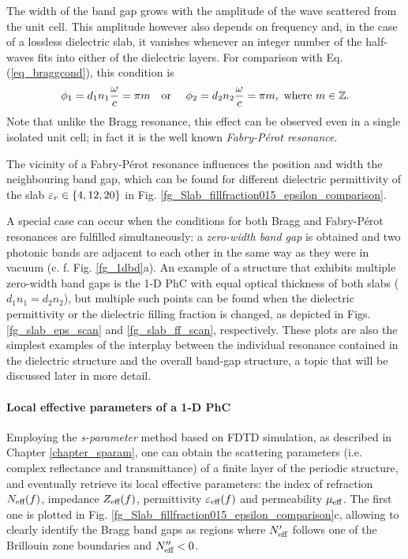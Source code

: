 The width of the band gap grows with the amplitude of the wave scattered from the unit cell. This amplitude however also depends on frequency and, in the case of a lossless dielectric slab, it vanishes whenever an integer number of the half-waves fits into either of the dielectric layers. For comparison with Eq. (\ref{eq_braggcond}), this condition is
\begin{equation} \phi_{1} = d_1 n_1 \frac{\omega}{c} = \pi m \text{\quad or \quad} \phi_{2} = d_2 n_2 \frac{\omega}{c} = \pi m, \text{ where } m\in \mathbb{Z}. \label{eq_fpcond}\end{equation}
Note that unlike the Bragg resonance, this effect can be observed even in a single isolated unit cell; in fact it is the well known \textit{Fabry-Pérot resonance}. 

The vicinity of a Fabry-Pérot resonance influences the position and width the neighbouring band gap, which can be found for different dielectric permittivity of the slab $\varepsilon_r\in\{4,12,20\}$ in Fig. \ref{fg_Slab_fillfraction015_epsilon_comparison}.

A special case can occur when the conditions for both Bragg and Fabry-Pérot resonances are fulfilled simultaneously: a \textit{zero-width band gap} is obtained and two photonic bands are adjacent to each other in the same way as they were in vacuum (c. f. Fig. \ref{fg_1dbd}a). An example of a structure that exhibits multiple zero-width band gaps is the 1-D PhC with equal optical thickness of both slabs ($d_1 n_1 = d_2 n_2$), but multiple such points can be found when the dielectric permittivity or the dielectric filling fraction is changed, as depicted in Figs. \ref{fg_slab_eps_scan} and \ref{fg_slab_ff_scan}, respectively. These plots are also the simplest examples of the interplay between the individual resonance contained in the dielectric structure and the overall band-gap structure, a topic that will be discussed later in more detail.

\paragraph{Local effective parameters of a 1-D PhC}
Employing the \textit{s-parameter} method based on FDTD simulation, as described in Chapter \ref{chapter_sparam}, one can obtain the scattering parameters (i.e. complex reflectance and transmittance) of a finite layer of the periodic structure, and eventually retrieve its local effective parameters: the index of refraction $N_{\text{eff} }(f)$, impedance $Z_{\text{eff} }(f)$, permittivity $\varepsilon_{\text{eff} }(f)$ and permeability $\mu_{\text{eff} }$. The first one is plotted in Fig. \ref{fg_Slab_fillfraction015_epsilon_comparison}c, allowing to clearly identify the Bragg band gaps as regions where $N_{\text{eff} }'$ follows one of the Brillouin zone boundaries and $N_{\text{eff} }'' < 0$.

